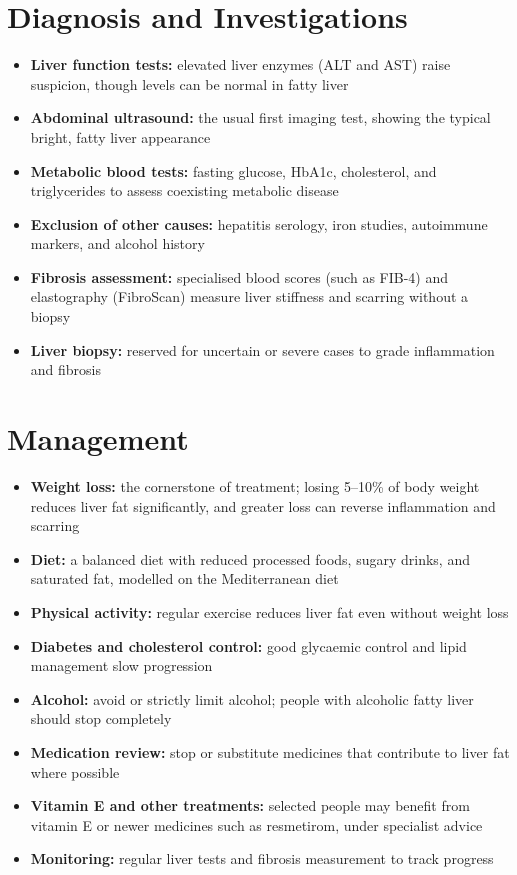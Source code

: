 \section*{Diagnosis and Investigations}
\begin{itemize}
    \item \textbf{Liver function tests:} elevated liver enzymes (ALT and AST) raise suspicion, though levels can be normal in fatty liver
    \item \textbf{Abdominal ultrasound:} the usual first imaging test, showing the typical bright, fatty liver appearance
    \item \textbf{Metabolic blood tests:} fasting glucose, HbA1c, cholesterol, and triglycerides to assess coexisting metabolic disease
    \item \textbf{Exclusion of other causes:} hepatitis serology, iron studies, autoimmune markers, and alcohol history
    \item \textbf{Fibrosis assessment:} specialised blood scores (such as FIB-4) and elastography (FibroScan) measure liver stiffness and scarring without a biopsy
    \item \textbf{Liver biopsy:} reserved for uncertain or severe cases to grade inflammation and fibrosis
\end{itemize}

\section*{Management}
\begin{itemize}
    \item \textbf{Weight loss:} the cornerstone of treatment; losing 5--10\% of body weight reduces liver fat significantly, and greater loss can reverse inflammation and scarring
    \item \textbf{Diet:} a balanced diet with reduced processed foods, sugary drinks, and saturated fat, modelled on the Mediterranean diet
    \item \textbf{Physical activity:} regular exercise reduces liver fat even without weight loss
    \item \textbf{Diabetes and cholesterol control:} good glycaemic control and lipid management slow progression
    \item \textbf{Alcohol:} avoid or strictly limit alcohol; people with alcoholic fatty liver should stop completely
    \item \textbf{Medication review:} stop or substitute medicines that contribute to liver fat where possible
    \item \textbf{Vitamin E and other treatments:} selected people may benefit from vitamin E or newer medicines such as resmetirom, under specialist advice
    \item \textbf{Monitoring:} regular liver tests and fibrosis measurement to track progress
\end{itemize}

